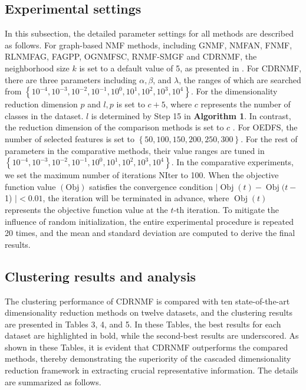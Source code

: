 \documentclass[a4paper,fleqn]{cas-sc}
\begin{document}
\subsection{Experimental settings}

In this subsection, the detailed parameter settings for all methods are described as follows. For graph-based NMF methods, including GNMF, NMFAN, FNMF, RLNMFAG, FAGPP, OGNMFSC,  RNMF-SMGF and CDRNMF, the neighborhood size $k$ is set to a default value of 5, as presented in \cite{19}. For CDRNMF, there are three parameters including $\alpha, \beta$, and $\lambda$, the ranges of which are searched from $\left\{10^{-4}, 10^{-3}, 10^{-2}, 10^{-1}, 10^0, 10^1, 10^2, 10^3, 10^4\right\}$. For the dimensionality reduction dimension $p$ and $l, p$ is set to $c+5$, where $c$ represents the number of classes in the dataset. $l$ is determined by Step 15 in \textbf{Algorithm 1}. In contrast, the reduction dimension of the comparison methods is set to $c$ \cite{47}. For OEDFS, the number of selected features is set to $\left\{50, 100, 150, 200, 250, 300\right\}$. For the rest of parameters in the comparative methods, their value ranges are tuned in $\left\{10^{-4}, 10^{-3}, 10^{-2}, 10^{-1}, 10^0, 10^1, 10^2, 10^3, 10^4\right\}$. In the comparative experiments, we set the maximum number of iterations NIter to 100. When the objective function value $(\mathrm{Obj})$ satisfies the convergence condition $\mid \operatorname{Obj}(t)-\operatorname{Obj}(t-$ 1) $\mid<0.01$, the iteration will be terminated in advance, where $\operatorname{Obj}(t)$ represents the objective function value at the $t$-th iteration. To mitigate the influence of random initialization, the entire experimental procedure is repeated 20 times, and the mean and standard deviation are computed to derive the final results.

\subsection{Clustering results and analysis}

The clustering performance of CDRNMF is compared with ten state-of-the-art dimensionality reduction methods on twelve datasets, and the clustering results are presented in Tables 3, 4, and 5. In these Tables, the best results for each dataset are highlighted in bold, while the second-best results are underscored. As shown in these Tables, it is evident that CDRNMF outperforms the compared methods, thereby demonstrating the superiority of the cascaded dimensionality reduction framework in extracting crucial representative information. The details are summarized as follows.
\end{document}
